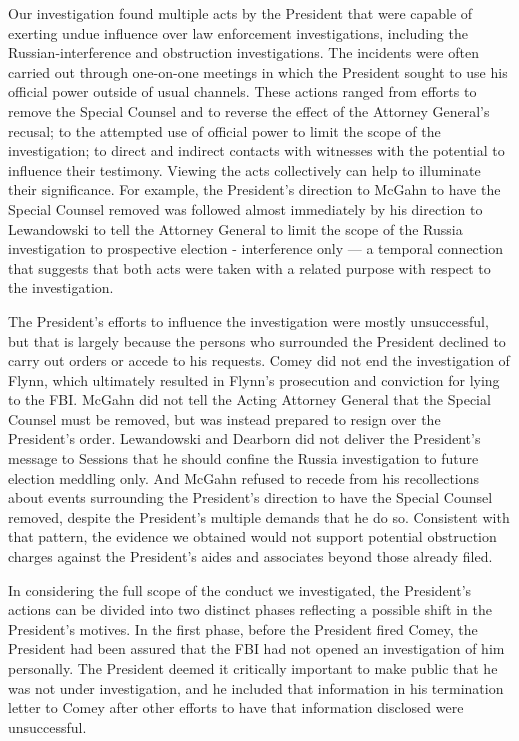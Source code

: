 {Our investigation found multiple acts by the President that were capable of exerting undue influence over law enforcement investigations, including the Russian-interference and obstruction investigations.
The incidents were often carried out through one-on-one meetings in which the President sought to use his official power outside of usual channels.
These actions ranged from efforts to remove the Special Counsel and to reverse the effect of the Attorney General's recusal; to the attempted use of official power to limit the scope of the investigation; to direct and indirect contacts with witnesses with the potential to influence their testimony.
Viewing the acts collectively can help to illuminate their significance.
For example, the President's direction to McGahn to have the Special Counsel removed was followed almost immediately by his direction to Lewandowski to tell the Attorney General to limit the scope of the Russia investigation to prospective election - interference only — a temporal connection that suggests that both acts were taken with a related purpose with respect to the investigation.

The President's efforts to influence the investigation were mostly unsuccessful, but that is largely because the persons who surrounded the President declined to carry out orders or accede to his requests.
Comey did not end the investigation of Flynn, which ultimately resulted in Flynn's prosecution and conviction for lying to the FBI.
McGahn did not tell the Acting Attorney General that the Special Counsel must be removed, but was instead prepared to resign over the President's order.
Lewandowski and Dearborn did not deliver the President's message to Sessions that he should confine the Russia investigation to future election meddling only.
And McGahn refused to recede from his recollections about events surrounding the President's direction to have the Special Counsel removed, despite the President's multiple demands that he do so.
Consistent with that pattern, the evidence we obtained would not support potential obstruction charges against the President's aides and associates beyond those already filed.

In considering the full scope of the conduct we investigated, the President's actions can be divided into two distinct phases reflecting a possible shift in the President's motives.
In the first phase, before the President fired Comey, the President had been assured that the FBI had not opened an investigation of him personally.
The President deemed it critically important to make public that he was not under investigation, and he included that information in his termination letter to Comey after other efforts to have that information disclosed were unsuccessful.

}
